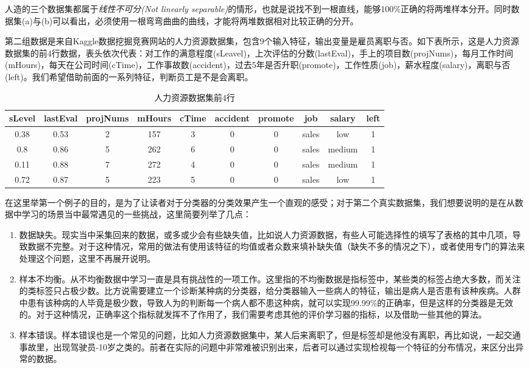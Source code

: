 \documentclass[UTF8, 12pt]{ctexart}
\begin{document}
人造的三个数据集都属于\emph{线性不可分(Not linearly separable)}的情形，也就是说找不到一根直线，能够100\%正确的将两堆样本分开。同时数据集(a)与(b)可以看出，必须使用一根弯弯曲曲的曲线，才能将两堆数据相对比较正确的分开。

第二组数据是来自Kaggle数据挖掘竞赛网站的人力资源数据集，包含9个输入特征，输出变量是雇员离职与否。如下表所示，这是人力资源数据集的前4行数据，表头依次代表：对工作的满意程度(sLeavel)，上次评估的分数(lastEval)，手上的项目数(projNums)，每月工作时间(mHours)，每天在公司时间(cTime)，工作事故数(accident)，过去5年是否升职(promote)，工作性质(job)，薪水程度(salary)，离职与否(left)。我们希望借助前面的一系列特征，判断员工是不是会离职。

\begin{table}[H]
	\centering
	\label{table1}
	\begin{tabular}{|c|c|c|c|c|c|c|c|c|c|}
		\hline
		sLevel & lastEval & projNums & mHours& cTime & accident & promote & job & salary & left\\
		\hline
		0.38 & 0.53 & 2 & 157 & 3 & 0 & 0 & sales & low & 1\\
		0.8 & 0.86 & 5 & 262 & 6 & 0 & 0 & sales & medium & 1\\
		0.11 & 0.88 & 7 & 272 & 4 & 0 & 0 & sales & medium & 1\\
		0.72 & 0.87 & 5 & 223 & 5 & 0 & 0 & sales & low & 1\\
		\hline
	\end{tabular}
	\caption{人力资源数据集前4行}
\end{table}

在这里举第一个例子的目的，是为了让读者对于分类器的分类效果产生一个直观的感受；对于第二个真实数据集，我们想要说明的是在从数据中学习的场景当中最常遇见的一些挑战，这里简要列举了几点：
\begin{enumerate}
	\item 数据缺失。现实当中采集回来的数据，或多或少会有些缺失值，比如说人力资源数据，有些人可能选择性的填写了表格的其中几项，导致数据不完整。对于这种情况，常用的做法有使用该特征的均值或者众数来填补缺失值（缺失不多的情况之下），或者使用专门的算法来处理这个问题，这里不再展开说明。
	\item 样本不均衡。从不均衡数据中学习一直是具有挑战性的一项工作。这里指的不均衡数据是指标签中，某些类的标签占绝大多数，而关注的类标签只占极少数。比方说需要建立一个诊断某种病的分类器，给分类器输入一些病人的特征，输出是病人是否患有该种疾病。人群中患有该种病的人毕竟是极少数，导致人为的判断每一个病人都不患这种病，就可以实现99.99\%的正确率，但是这样的分类器是无效的。对于这种情况，正确率这个指标就发挥不了作用了，我们需要考虑其他的评价学习器的指标，以及借助一些其他的算法。
	\item 样本错误。样本错误也是一个常见的问题，比如人力资源数据集中，某人后来离职了，但是标签却是他没有离职，再比如说，一起交通事故里，出现驾驶员-10岁之类的。前者在实际的问题中非常难被识别出来，后者可以通过实现检视每一个特征的分布情况，来区分出异常的数据。
\end{enumerate}
\end{document}
